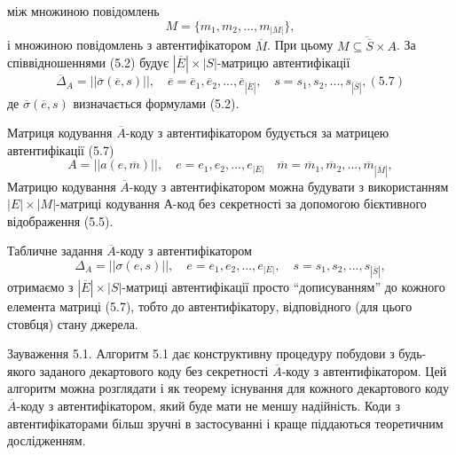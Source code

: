 між множиною повідомлень
\begin{equation*}
    M = \{m_1, m_2, ..., m_{|M|}\},
\end{equation*}
і множиною повідомлень з автентифікатором $\overline{M}$. При цьому $\overline{M \subseteq \overline{S} \times A}$.
За співвідношеннями (5.2) будує $|\overline{E}| \times |S|$-матрицю автентифікації
\begin{equation}
    \overline{\Delta}_A = ||\overline{\sigma}(\overline{e}, s)||,
        \quad \overline{e} = \overline{e}_1, \overline{e}_2, ..., \overline{e}_{|\overline{E}|},
        \quad s = s_1, s_2, ..., s_{|\overline{S}|}, (5.7)
\end{equation}
де $\overline{\sigma}(\overline{e}, s)$ визначається формулами (5.2).

Матриця кодування $\overline{A}$-коду з автентифікатором будується за матрицею
автентифікації (5.7)
\begin{equation*}
    A = ||a(e, \overline{m})||,
        \quad e = e_1, e_2, ..., e_{|E|}
        \quad \overline{m} = \overline{m}_1, \overline{m}_2, ..., \overline{m}_{|\overline{M}|},
\end{equation*}
Матрицю кодування $\overline{A}$-коду з автентифікатором можна будувати з
використанням $|E| \times |M|$-матриці кодування А-код без секретності за
допомогою бієктивного відображення (5.5).

Табличне задання $\overline{A}$-коду з автентифікатором
\begin{equation}
    \Delta_A = ||\sigma(e, s)||,
        \quad e = e_1, e_2, ..., e_{|E|},
        \quad s = s_1, s_2, ..., s_{|\overline{S}|},
\end{equation}
отримаємо з $|\overline{E}| \times |S|$-матриці автентифікації просто ``дописуванням'' до
кожного елемента матриці (5.7), тобто до автентифікатору, відповідного (для
цього стовбця) стану джерела.

\begin{remark}
    Зауваження 5.1. Алгоритм 5.1 дає конструктивну процедуру побудови з
    будь-якого заданого декартового коду без секретності $\overline{A}$-коду з
    автентифікатором. Цей алгоритм можна розглядати і як теорему існування
    для кожного декартового коду $\overline{A}$-коду з автентифікатором, який буде мати не
    меншу надійність. Коди з автентифікаторами більш зручні в застосуванні і
    краще піддаються теоретичним дослідженням.
\end{remark}

